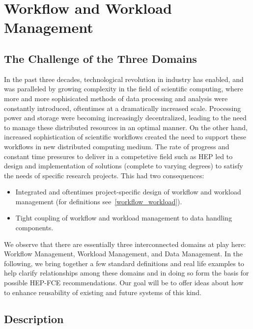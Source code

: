 \newpage
\section{Workflow and Workload Management}
\subsection{The Challenge of the Three Domains}
In the past three decades, technological revolution in industry has enabled, and was paralleled by growing complexity in the field of scientific computing, where 
more and more sophisicated methods of data processing and analysis were constantly introduced, oftentimes at a dramatically increased scale. Processing power and storage
were becoming increasingly decentralized, leading to the need to manage these distributed resources in an optimal manner. On the other hand, increased sophistication of
scientific workflows created the need to support these workflows in new distributed computing medium. The rate of progress and constant time pressures to deliver in a
competetive field such as HEP led to design and implementation of solutions (complete to varying degrees) to satisfy the needs of specific  research projects.
This had two consequences:

\begin{itemize}
\item Integrated and oftentimes project-specific design of workflow and workload management (for definitions see~\ref{workflow_workload}).
\item Tight coupling of workflow and workload management to data handling components.
\end{itemize}

We observe that there are essentially three interconnected domains at play here: Workflow Management, Workload Management, and Data Management.
In the following, we  bring together a few standard definitions and real life examples to help clarify
relationships among these domains and in doing so form the basis for possible HEP-FCE recommendations.
Our goal will be to offer ideas about how to enhance reusability of existing and future systems of this kind.

\subsection{Description}

